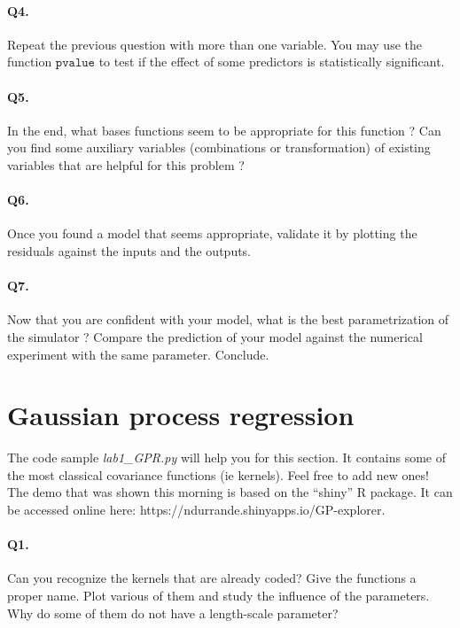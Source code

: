 \documentclass[12pt]{scrartcl}
\begin{document}
\paragraph{Q4.} Repeat the previous question with more than one variable. You may use the function $\texttt{pvalue}$ to test if the effect of some predictors is statistically significant.

\paragraph{Q5.} In the end, what bases functions seem to be appropriate for this function ? Can you find some auxiliary variables (combinations or transformation) of existing variables that are helpful for this problem ?

\paragraph{Q6.} Once you found a model that seems appropriate, validate it by plotting the residuals against the inputs and the outputs.

\paragraph{Q7.} Now that you are confident with your model, what is the best parametrization of the simulator ? Compare the prediction of your model against the numerical experiment with the same parameter. Conclude.

\section{Gaussian process regression}
The code sample \emph{lab1\_GPR.py} will help you for this section. It contains some of the most classical covariance functions (ie kernels). Feel free to add new ones! The demo that was shown this morning is based on the ``shiny'' R package. It can be accessed online here: https://ndurrande.shinyapps.io/GP-explorer.

\paragraph{Q1.} Can you recognize the kernels that are already coded? Give the functions a proper name. Plot various of them and study the influence of the parameters. Why do some of them do not have a length-scale parameter?
\end{document}
